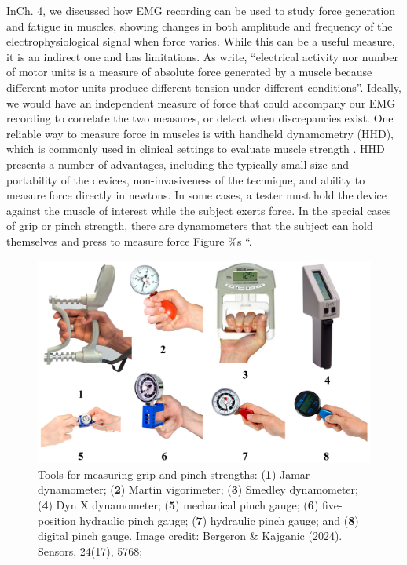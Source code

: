 \documentclass{article}
\begin{document}
In\href{https://curvenote.com/oxa:EPpXta8zJdzN048lz8AR/oZzZ9YkLDYhuIWC3d5Sk}{Ch. 4}, we discussed how EMG recording can be used to study force generation and fatigue in muscles, showing changes in both amplitude and frequency of the electrophysiological signal when force varies. While this can be a useful measure, it is an indirect one and has limitations. As \citet{levangie2011joint} write, ``\dotsneither electrical activity nor number of motor units is a measure of absolute force generated by a muscle because different motor units produce different tension under different conditions''. Ideally, we would have an independent measure of force that could accompany our EMG recording to correlate the two measures, or detect when discrepancies exist. One reliable way to measure force in muscles is with handheld dynamometry (HHD), which is commonly used in clinical settings to evaluate muscle strength \citep{kolber2005strength, mendoza2014muscle}. HHD presents a number of advantages, including the typically small size and portability of the devices, non-invasiveness of the technique, and ability to measure force directly in newtons. In some cases, a tester must hold the device against the muscle of interest while the subject exerts force. In the special cases of grip or pinch strength, there are dynamometers that the subject can hold themselves and press to measure force \citep{}Figure \%s ``.

\begin{figure}[!htbp]
\centering
\includegraphics[width=0.9\linewidth]{files/EPpXta8zJdzN048lz8AR-34ccfc6a036ea71458794d37f0a86940.png}
\caption[]{Tools for measuring grip and pinch strengths: (\textbf{1}) Jamar dynamometer; (\textbf{2}) Martin vigorimeter; (\textbf{3}) Smedley dynamometer; (\textbf{4}) Dyn X dynamometer; (\textbf{5}) mechanical pinch gauge; (\textbf{6}) five-position hydraulic pinch gauge; (\textbf{7}) hydraulic pinch gauge; and (\textbf{8}) digital pinch gauge. Image credit: Bergeron \& Kajganic (2024). Sensors, 24(17), 5768; \cite{bergeron2024pressure}}
\label{TosSycwkOy}
\end{figure}
\end{document}
